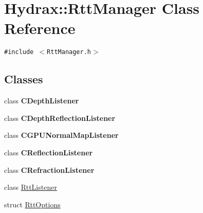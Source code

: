 \hypertarget{class_hydrax_1_1_rtt_manager}{
\section{Hydrax::RttManager Class Reference}
\label{class_hydrax_1_1_rtt_manager}
}
{\tt \#include $<$RttManager.h$>$}

\subsection*{Classes}
\begin{CompactItemize}
\item 
class \textbf{CDepthListener}
\item 
class \textbf{CDepthReflectionListener}
\item 
class \textbf{CGPUNormalMapListener}
\item 
class \textbf{CReflectionListener}
\item 
class \textbf{CRefractionListener}
\item 
class \hyperlink{class_hydrax_1_1_rtt_manager_1_1_rtt_listener}{RttListener}
\item 
struct \hyperlink{struct_hydrax_1_1_rtt_manager_1_1_rtt_options}{RttOptions}
\end{CompactItemize}
